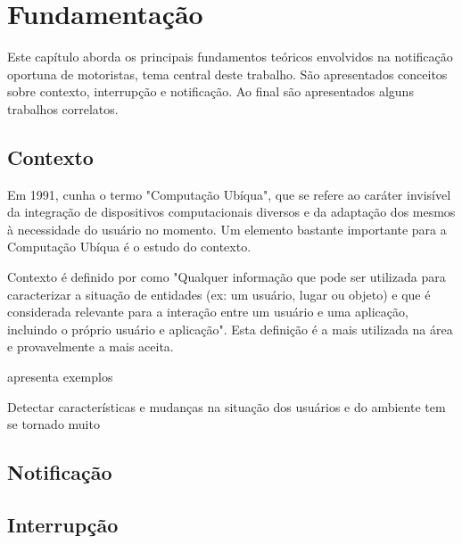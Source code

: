 \chapter{Fundamentação}
\label{fundamentacao}
Este capítulo aborda os principais fundamentos teóricos envolvidos na notificação oportuna de motoristas,
tema central deste trabalho. São apresentados conceitos sobre contexto, interrupção e notificação.
Ao final são apresentados alguns trabalhos correlatos.

\section{Contexto}
\label{contexto}
Em 1991, \cite{weiser1991computer} cunha o termo "Computação Ubíqua", que se refere ao caráter invisível da
integração de dispositivos computacionais diversos e da adaptação dos mesmos à necessidade do usuário no momento.
Um elemento bastante importante para a Computação Ubíqua é o estudo do contexto.

Contexto é definido por \cite{dey2001understanding} como "Qualquer informação que pode ser utilizada para
caracterizar a situação de entidades (ex: um usuário, lugar ou objeto) e que é considerada relevante para
a interação entre um usuário e uma aplicação, incluindo o próprio usuário e aplicação". Esta definição é
a mais utilizada na área e provavelmente a mais aceita.

\cite{ryan1999enhanced} apresenta exemplos 

Detectar características e mudanças na situação dos usuários e do ambiente tem se tornado muito

\section{Notificação}
\label{notificacao}

\section{Interrupção}
\label{interrupcao}
